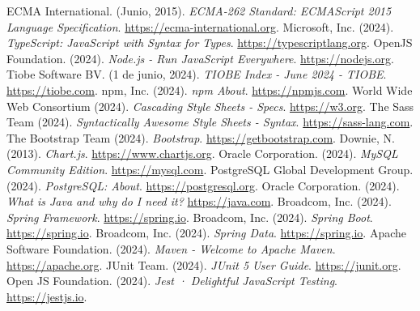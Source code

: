 \begin{thebibliography}{99}
     ECMA International. (Junio, 2015). \textit{ECMA-262 Standard: ECMAScript 2015 Language Specification}. \href{https://ecma-international.org/wp-content/uploads/ECMA-262_6th_edition_june_2015.pdf}{https://ecma-international.org}.
     Microsoft, Inc. (2024). \textit{TypeScript: JavaScript with Syntax for Types}. \href{https://www.typescriptlang.org}{https://typescriptlang.org}.
     OpenJS Foundation. (2024). \textit{Node.js - Run JavaScript Everywhere}. \href{https://nodejs.org/en}{https://nodejs.org}.
     Tiobe Software BV. (1 de junio, 2024). \textit{TIOBE Index - June 2024 - TIOBE}. \href{https://www.tiobe.com/tiobe-index}{https://tiobe.com}.
     npm, Inc. (2024). \textit{npm About}. \href{https://www.npmjs.com/about}{https://npmjs.com}.
     World Wide Web Consortium (2024). \textit{Cascading Style Sheets - Specs}. \href{https://www.w3.org/Style/CSS/#specs}{https://w3.org}.
     The Sass Team (2024). \textit{Syntactically Awesome Style Sheets - Syntax}. \href{https://sass-lang.com/documentation/syntax}{https://sass-lang.com}.
     The Bootstrap Team (2024). \textit{Bootstrap}. \href{https://getbootstrap.com}{https://getbootstrap.com}.
     Downie, N. (2013). \textit{Chart.js}. \href{https://www.chartjs.org}{https://www.chartjs.org}.
     Oracle Corporation. (2024). \textit{MySQL Community Edition}. \href{https://www.mysql.com/products/community/}{https://mysql.com}.
     PostgreSQL Global Development Group. (2024). \textit{PostgreSQL: About}. \href{https://www.postgresql.org/about/}{https://postgresql.org}.
     Oracle Corporation. (2024). \textit{What is Java and why do I need it?} \href{https://www.java.com/download/help/whatis_java.html}{https://java.com}.
     Broadcom, Inc. (2024). \textit{Spring Framework}. \href{https://spring.io/projects/spring-framework}{https://spring.io}.
     Broadcom, Inc. (2024). \textit{Spring Boot}. \href{https://spring.io/projects/spring-boot}{https://spring.io}.
     Broadcom, Inc. (2024). \textit{Spring Data}. \href{https://spring.io/projects/spring-data}{https://spring.io}.
     Apache Software Foundation. (2024). \textit{Maven - Welcome to Apache Maven}. \href{https://maven.apache.org}{https://apache.org}.
     JUnit Team. (2024). \textit{JUnit 5 User Guide}. \href{https://junit.org/junit5/docs/current/user-guide/}{https://junit.org}.
     Open JS Foundation. (2024). \textit{Jest · Delightful JavaScript Testing}. \href{https://jestjs.io/}{https://jestjs.io}.
    

\end{thebibliography}
